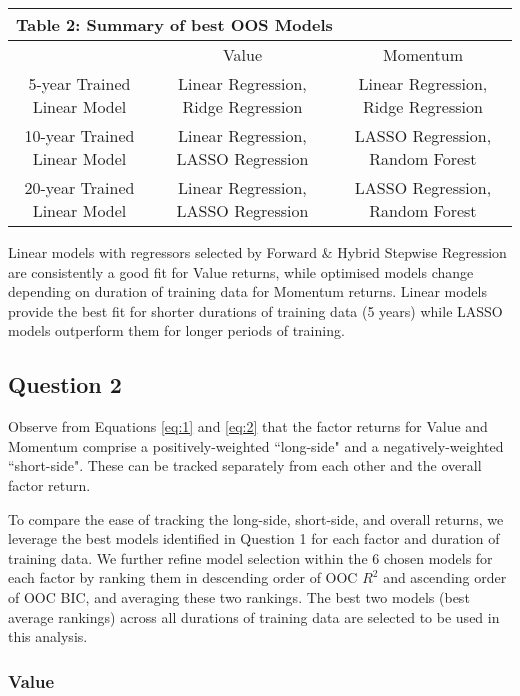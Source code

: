 \documentclass[AER]{AEA}
\begin{document}
\begin{spacing}{2}
\begin{spacing}{1}
\begin{table}[H]
    \centering
    \begin{tabular}{|c|c|c|}
    \multicolumn{3}{l}{\textbf{Table 2: Summary of best OOS Models}}\\
    \hline
    & Value & Momentum \\
     \hline
     5-year Trained Linear Model & Linear Regression, Ridge Regression & Linear Regression, Ridge Regression \\
    \hline
    10-year Trained Linear Model & Linear Regression, LASSO Regression & LASSO Regression, Random Forest \\
    \hline
    20-year Trained Linear Model & Linear Regression, LASSO Regression & LASSO Regression, Random Forest \\
    \hline
    \end{tabular}
\end{table}
\end{spacing}

Linear models with regressors selected by Forward \& Hybrid Stepwise Regression are consistently a good fit for Value returns, while optimised models change depending on duration of training data for Momentum returns. Linear models provide the best fit for shorter durations of training data (5 years) while LASSO models outperform them for longer periods of training.


\subsection{Question 2}

Observe from Equations \ref{eq:1} and \ref{eq:2} that the factor returns for Value and Momentum comprise a positively-weighted ``long-side" and a negatively-weighted ``short-side". These can be tracked separately from each other and the overall factor return.

To compare the ease of tracking the long-side, short-side, and overall returns, we leverage the best models identified in Question 1 for each factor and duration of training data. We further refine model selection within the 6 chosen models for each factor by ranking them in descending order of OOC \(R^2\) and ascending order of OOC BIC, and averaging these two rankings. The best two models (best average rankings) across all durations of training data are selected to be used in this analysis.

\subsubsection{Value}


\end{spacing}
\end{document}
